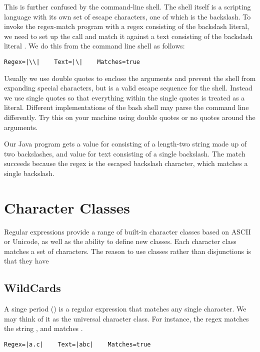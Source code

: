 This is further confused by the command-line shell.
The shell itself is a scripting language with its own set of
escape characters, one of which is the backslash.
To invoke the regex-match program with a regex consisting 
of the backslash literal, we need to set up the call 
and match it against a text consisting of the backslash literal \code{\bk\bk}.
We do this from the command line shell as follows:
%
%
\begin{verbatim}
Regex=|\\|    Text=|\|    Matches=true
\end{verbatim}
%
Usually we use double quotes to enclose the arguments and prevent
the shell from expanding special characters, but  is a valid escape
sequence for the shell.  Instead we use single quotes
so that everything within the single quotes is treated
as a literal. Different implementations of the bash shell may
parse the command line differently.  Try this on your machine
using double quotes or no quotes around the arguments.
%

Our Java program gets a value for  consisting of a
length-two string made up of two backslashes, and value for text
consisting of a single backslash.  The match succeeds because the
regex \code{\bk\bk} is the escaped backslash character, which matches
a single backslash.


\section{Character Classes}

Regular expressions provide a range of built-in character classes
based on ASCII or Unicode, as well as the ability to define new
classes.  Each character class matches a set of characters.  The
reason to use classes rather than disjunctions is that they have


\subsection{WildCards}\label{section:regex-wildcard}

A singe period () is a regular expression that matches any
single character.  We may think of it as the universal character class.
For instance, the regex  matches the string ,
and  matches .%
%
\begin{verbatim}
Regex=|a.c|    Text=|abc|    Matches=true
\end{verbatim}
%

